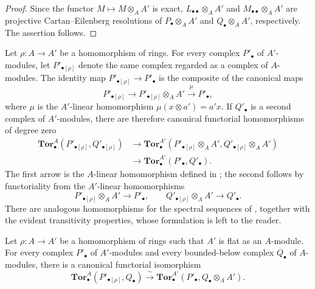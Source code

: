 \begin{proof}
Since the functor $M\longmapsto M\otimes_AA'$ is exact,
$L_{\bullet\bullet}\otimes_AA'$ and
$M_{\bullet\bullet}\otimes_AA'$ are projective
Cartan--Eilenberg resolutions of $P_\bullet\otimes_AA'$ and
$Q_\bullet\otimes_AA'$, respectively.  The assertion follows.
\end{proof}

\begin{env}[6.3.10]
\label{III.6.3.10}
Let $\rho:A\longrightarrow A'$ be a homomorphism of rings.  For
every complex $P'_\bullet$ of $A'$-modules, let
$P'_{\bullet[\rho]}$ denote the same complex regarded as a complex
of $A$-modules.  The identity map
$P'_{\bullet[\rho]}\longrightarrow P'_\bullet$ is the composite of
the canonical maps
\[
  P'_{\bullet[\rho]}
  \longrightarrow
  P'_{\bullet[\rho]}\otimes_AA'
  \xrightarrow{\ \mu\ }P'_\bullet,
\]
where $\mu$ is the $A'$-linear homomorphism
$\mu(x\otimes a')=a'x$.  If $Q'_\bullet$ is a second complex of
$A'$-modules, there are therefore canonical functorial
homomorphisms of degree zero
\[
  \begin{split}
  \mathbf{Tor}_\bullet^A(P'_{\bullet[\rho]},Q'_{\bullet[\rho]})
  &\longrightarrow
  \mathbf{Tor}_\bullet^{A'}
  (P'_{\bullet[\rho]}\otimes_AA',
   Q'_{\bullet[\rho]}\otimes_AA')\\
  &\longrightarrow
  \mathbf{Tor}_\bullet^{A'}(P'_\bullet,Q'_\bullet).
  \end{split}
  \tag{6.3.10.1}\label{III.6.3.10.1}
\]
The first arrow is the $A$-linear homomorphism defined in
; the second follows by functoriality from the
$A'$-linear homomorphisms
\[
  P'_{\bullet[\rho]}\otimes_AA'\longrightarrow P'_\bullet,
  \qquad
  Q'_{\bullet[\rho]}\otimes_AA'\longrightarrow Q'_\bullet.
\]
There are analogous homomorphisms for the spectral sequences of
, together with the evident transitivity
properties, whose formulation is left to the reader.
\end{env}

\begin{proposition}[6.3.11]
\label{III.6.3.11}
Let $\rho:A\longrightarrow A'$ be a homomorphism of rings such that
$A'$ is flat as an $A$-module.  For every complex $P'_\bullet$ of
$A'$-modules and every bounded-below complex $Q_\bullet$ of
$A$-modules, there is a canonical functorial isomorphism
\[
  \mathbf{Tor}_\bullet^A(P'_{\bullet[\rho]},Q_\bullet)
  \xrightarrow{\ \sim\ }
  \mathbf{Tor}_\bullet^{A'}(P'_\bullet,Q_\bullet\otimes_AA').
  \tag{6.3.11.1}\label{III.6.3.11.1}
\]
\end{proposition}


